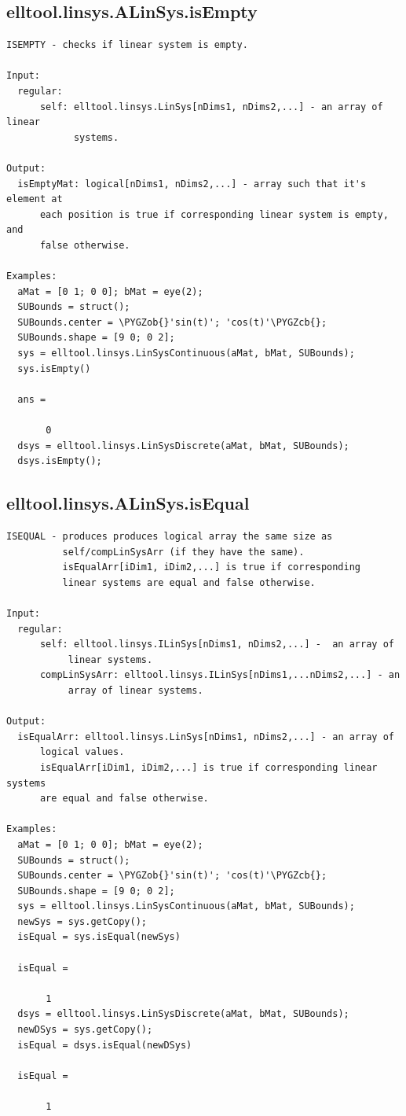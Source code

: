 \documentclass[letterpaper,10pt,english]{sphinxmanual}
\def\PYGZob{\char`\{}
\def\PYGZcb{\char`\}}
\begin{document}
\subsection{elltool.linsys.ALinSys.isEmpty}
\label{chap_functions:elltool-linsys-alinsys-isempty}
\begin{Verbatim}[commandchars=\\\{\}]
ISEMPTY - checks if linear system is empty.

Input:
  regular:
      self: elltool.linsys.LinSys[nDims1, nDims2,...] - an array of linear
            systems.

Output:
  isEmptyMat: logical[nDims1, nDims2,...] - array such that it's element at
      each position is true if corresponding linear system is empty, and
      false otherwise.

Examples:
  aMat = [0 1; 0 0]; bMat = eye(2);
  SUBounds = struct();
  SUBounds.center = \PYGZob{}'sin(t)'; 'cos(t)'\PYGZcb{};
  SUBounds.shape = [9 0; 0 2];
  sys = elltool.linsys.LinSysContinuous(aMat, bMat, SUBounds);
  sys.isEmpty()

  ans =

       0
  dsys = elltool.linsys.LinSysDiscrete(aMat, bMat, SUBounds);
  dsys.isEmpty();
\end{Verbatim}


\subsection{elltool.linsys.ALinSys.isEqual}
\label{chap_functions:elltool-linsys-alinsys-isequal}
\begin{Verbatim}[commandchars=\\\{\}]
ISEQUAL - produces produces logical array the same size as
          self/compLinSysArr (if they have the same).
          isEqualArr[iDim1, iDim2,...] is true if corresponding
          linear systems are equal and false otherwise.

Input:
  regular:
      self: elltool.linsys.ILinSys[nDims1, nDims2,...] -  an array of
           linear systems.
      compLinSysArr: elltool.linsys.ILinSys[nDims1,...nDims2,...] - an
           array of linear systems.

Output:
  isEqualArr: elltool.linsys.LinSys[nDims1, nDims2,...] - an array of
      logical values.
      isEqualArr[iDim1, iDim2,...] is true if corresponding linear systems
      are equal and false otherwise.

Examples:
  aMat = [0 1; 0 0]; bMat = eye(2);
  SUBounds = struct();
  SUBounds.center = \PYGZob{}'sin(t)'; 'cos(t)'\PYGZcb{};
  SUBounds.shape = [9 0; 0 2];
  sys = elltool.linsys.LinSysContinuous(aMat, bMat, SUBounds);
  newSys = sys.getCopy();
  isEqual = sys.isEqual(newSys)

  isEqual =

       1
  dsys = elltool.linsys.LinSysDiscrete(aMat, bMat, SUBounds);
  newDSys = sys.getCopy();
  isEqual = dsys.isEqual(newDSys)

  isEqual =

       1
\end{Verbatim}
\end{document}
